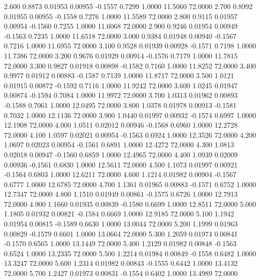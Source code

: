    2.600   0.8873   0.01953   0.00955  -0.1557   0.7299   1.0000  11.5060  72.0000
   2.700   0.8992   0.01955   0.00955  -0.1558   0.7276   1.0000  11.5589  72.0000
   2.800   0.9115   0.01957   0.00954  -0.1560   0.7255   1.0000  11.6068  72.0000
   2.900   0.9246   0.01954   0.00949  -0.1563   0.7235   1.0000  11.6518  72.0000
   3.000   0.9384   0.01948   0.00940  -0.1567   0.7216   1.0000  11.6955  72.0000
   3.100   0.9528   0.01939   0.00928  -0.1571   0.7198   1.0000  11.7386  72.0000
   3.200   0.9676   0.01929   0.00914  -0.1576   0.7179   1.0000  11.7815  72.0000
   3.300   0.9827   0.01918   0.00898  -0.1582   0.7160   1.0000  11.8252  72.0000
   3.400   0.9977   0.01912   0.00883  -0.1587   0.7139   1.0000  11.8717  72.0000
   3.500   1.0121   0.01915   0.00872  -0.1592   0.7116   1.0000  11.9242  72.0000
   3.600   1.0245   0.01947   0.00874  -0.1594   0.7084   1.0000  11.9972  72.0000
   3.700   1.0313   0.01962   0.00893  -0.1588   0.7061   1.0000  12.0495  72.0000
   3.800   1.0378   0.01978   0.00913  -0.1581   0.7032   1.0000  12.1136  72.0000
   3.900   1.0440   0.01997   0.00932  -0.1574   0.6997   1.0000  12.1908  72.0000
   4.000   1.0511   0.02012   0.00946  -0.1568   0.6960   1.0000  12.2728  72.0000
   4.100   1.0597   0.02021   0.00954  -0.1563   0.6924   1.0000  12.3526  72.0000
   4.200   1.0697   0.02023   0.00954  -0.1561   0.6891   1.0000  12.4272  72.0000
   4.300   1.0813   0.02018   0.00947  -0.1560   0.6859   1.0000  12.4965  72.0000
   4.400   1.0939   0.02009   0.00936  -0.1561   0.6830   1.0000  12.5611  72.0000
   4.500   1.1073   0.01997   0.00921  -0.1564   0.6803   1.0000  12.6211  72.0000
   4.600   1.1214   0.01982   0.00904  -0.1567   0.6777   1.0000  12.6785  72.0000
   4.700   1.1361   0.01965   0.00883  -0.1571   0.6752   1.0000  12.7347  72.0000
   4.800   1.1510   0.01949   0.00861  -0.1575   0.6726   1.0000  12.7913  72.0000
   4.900   1.1660   0.01935   0.00839  -0.1580   0.6699   1.0000  12.8511  72.0000
   5.000   1.1805   0.01932   0.00821  -0.1584   0.6669   1.0000  12.9185  72.0000
   5.100   1.1942   0.01954   0.00815  -0.1589   0.6630   1.0000  13.0044  72.0000
   5.200   1.1999   0.01963   0.00829  -0.1579   0.6601   1.0000  13.0664  72.0000
   5.300   1.2059   0.01974   0.00841  -0.1570   0.6565   1.0000  13.1449  72.0000
   5.400   1.2129   0.01982   0.00848  -0.1563   0.6524   1.0000  13.2335  72.0000
   5.500   1.2214   0.01984   0.00849  -0.1558   0.6482   1.0000  13.3247  72.0000
   5.600   1.2314   0.01982   0.00843  -0.1555   0.6442   1.0000  13.4132  72.0000
   5.700   1.2427   0.01973   0.00831  -0.1554   0.6402   1.0000  13.4989  72.0000
